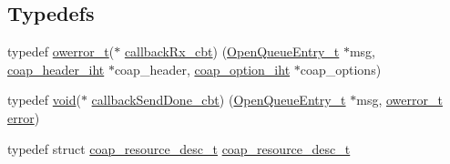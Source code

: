 \subsection*{Typedefs}
\begin{DoxyCompactItemize}
\item 
typedef \hyperlink{opendefs_8h_af20b7c3ed9d2ba19e56a309ad9314803}{owerror\+\_\+t}($\ast$ \hyperlink{group__open_coap_gac41957963dd35c0f62acbb44f369fa61}{callback\+Rx\+\_\+cbt}) (\hyperlink{struct_open_queue_entry__t}{Open\+Queue\+Entry\+\_\+t} $\ast$msg, \hyperlink{structcoap__header__iht}{coap\+\_\+header\+\_\+iht} $\ast$coap\+\_\+header, \hyperlink{structcoap__option__iht}{coap\+\_\+option\+\_\+iht} $\ast$coap\+\_\+options)
\item 
typedef \hyperlink{usb__devapi_8h_afabf60e7f57651d6d595a02c75f07cd0}{void}($\ast$ \hyperlink{group__open_coap_ga62a54b4b86c9835fe33d997b069193bc}{callback\+Send\+Done\+\_\+cbt}) (\hyperlink{struct_open_queue_entry__t}{Open\+Queue\+Entry\+\_\+t} $\ast$msg, \hyperlink{opendefs_8h_af20b7c3ed9d2ba19e56a309ad9314803}{owerror\+\_\+t} \hyperlink{disk_8c_ad018a3100b2dabad325a0800152db297}{error})
\item 
typedef struct \hyperlink{structcoap__resource__desc__t}{coap\+\_\+resource\+\_\+desc\+\_\+t} \hyperlink{group__open_coap_ga507ec6b3ff0f2c55b7965a3a243c4fd0}{coap\+\_\+resource\+\_\+desc\+\_\+t}
\end{DoxyCompactItemize}
